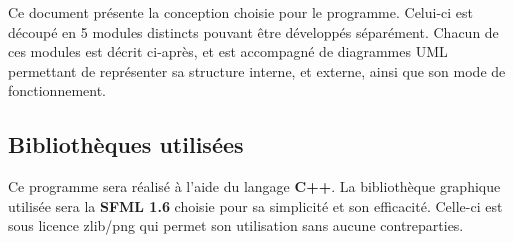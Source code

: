 Ce document présente la conception choisie pour le programme. Celui-ci est découpé en 5 modules distincts pouvant être développés séparément. Chacun de ces modules est décrit ci-après, et est accompagné de diagrammes UML permettant de représenter sa structure interne, et externe, ainsi que son mode de fonctionnement.

\vspace{0.5cm}

\subsection{Bibliothèques utilisées}

Ce programme sera réalisé à l'aide du langage \textbf{C++}. La bibliothèque graphique utilisée sera la \textbf{SFML 1.6} choisie pour sa simplicité et son efficacité. Celle-ci est sous licence zlib/png qui permet son utilisation sans aucune contreparties.